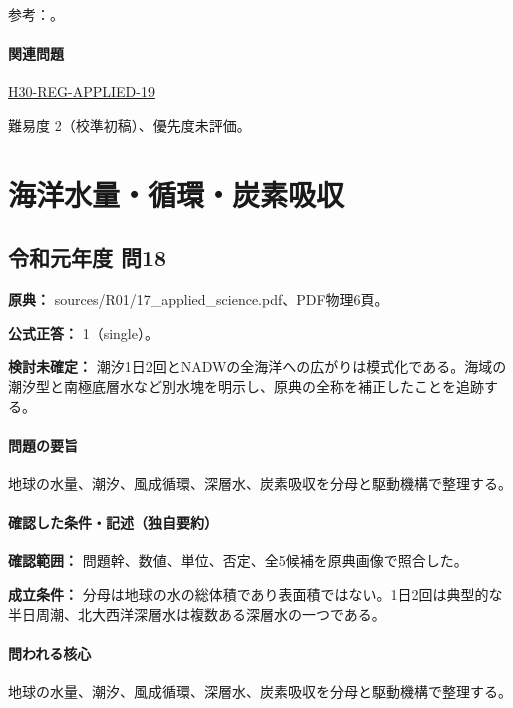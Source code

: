 \par 参考：\cite{noaa_sea_salt,noaa_nutrient_observations,noaa_overturning,feely_carbonate2004,jamstec_deep_resources}。

\paragraph{関連問題} \hyperref[q:h30-reg-applied-19]{H30-REG-APPLIED-19}

\par 難易度 2（校準初稿）、優先度未評価。

\section{海洋水量・循環・炭素吸収}

\subsection{令和元年度 問18}
\label{q:r01-reg-applied-18}

\noindent\textbf{原典：} sources/R01/17\_applied\_science.pdf、PDF物理6頁。

\textbf{公式正答：} 1（single）。

\par\textbf{検討未確定：} 潮汐1日2回とNADWの全海洋への広がりは模式化である。海域の潮汐型と南極底層水など別水塊を明示し、原典の全称を補正したことを追跡する。

\paragraph{問題の要旨} 地球の水量、潮汐、風成循環、深層水、炭素吸収を分母と駆動機構で整理する。

\paragraph{確認した条件・記述（独自要約）}\mbox{}\par

\noindent\textbf{確認範囲：} 問題幹、数値、単位、否定、全5候補を原典画像で照合した。\par

\noindent\textbf{成立条件：} 分母は地球の水の総体積であり表面積ではない。1日2回は典型的な半日周潮、北大西洋深層水は複数ある深層水の一つである。\par

\paragraph{問われる核心} 地球の水量、潮汐、風成循環、深層水、炭素吸収を分母と駆動機構で整理する。

